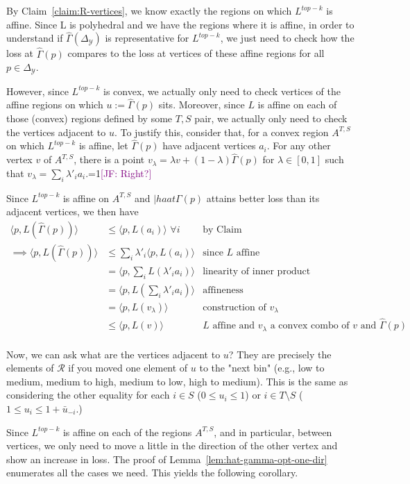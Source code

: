 \documentclass[12pt]{article}
\newcommand{\Comments}{1}
\newcommand{\mynote}[2]{\ifnum\Comments=1\textcolor{#1}{#2}\fi}
\newcommand{\jessie}[1]{\mynote{purple}{[JF: #1]}}
\newcommand{\simplex}{\Delta_\Y}
\newcommand{\R}{\mathcal{R}}
\newcommand{\Y}{\mathcal{Y}}
\newcommand{\inprod}[2]{\langle #1, #2 \rangle}%
\begin{document}
By Claim~\ref{claim:R-vertices}, we know exactly the regions on which $L^{top-k}$ is affine.
Since L is polyhedral and we have the regions where it is affine, in order to understand if $\hat \Gamma(\simplex)$ is representative for $L^{top-k}$, we just need to check how the loss at $\hat \Gamma(p)$ compares to the loss at vertices of these affine regions for all $p \in \simplex$.  

However, since $L^{top-k}$ is convex, we actually only need to check vertices of the affine regions on which $u := \hat \Gamma(p)$ sits.  
Moreover, since $L$ is affine on each of those (convex) regions defined by some $T,S$ pair, we actually only need to check the vertices adjacent to $u$.
To justify this, consider that, for a convex region $A^{T,S}$ on which $L^{top-k}$ is affine, let $\hat \Gamma(p)$ have adjacent vertices $a_i$.
For any other vertex $v$ of $A^{T,S}$, there is a point $v_\lambda = \lambda v + (1-\lambda) \hat \Gamma(p)$ for $\lambda \in [0,1]$ such that $v_\lambda = \sum_i \lambda'_i a_i$.\jessie{Right?}

Since $L^{top-k}$ is affine on $A^{T,S}$ and $|haat \Gamma(p)$ attains better loss than its adjacent vertices, we then have 
\begin{align*}
\inprod{p}{L(\hat \Gamma(p))} &\leq \inprod{p}{L(a_i)} \,\, \forall i & \text{by Claim} \\
\implies \inprod{p}{L(\hat \Gamma(p))} &\leq \sum_i \lambda'_i \inprod{p}{L(a_i)} & \text{since $L$ affine} \\
&= \inprod{p}{\sum_i L(\lambda'_i a_i)} & \text{linearity of inner product}\\
&= \inprod{p}{L(\sum_i \lambda'_i a_i)} & \text{affineness}\\
&= \inprod{p}{L(v_\lambda)} & \text{construction of $v_\lambda$}\\
&\leq \inprod{p}{L(v)} & \text{$L$ affine and $v_\lambda$ a convex combo of $v$ and $\hat \Gamma(p)$}\\
\end{align*}

Now, we can ask what are the vertices adjacent to $u$?  They are precisely the elements of $\R$ if you moved one element of $u$ to the "next bin" (e.g., low to medium, medium to high, medium to low, high to medium).  
This is the same as considering the other equality for each $i \in S$ ($0 \leq u_i \leq 1$) or $i \in T \setminus S$ ($1 \leq u_i \leq 1 + \bar u_{-i}$.) 

Since $L^{top-k}$ is affine on each of the regions $A^{T,S}$,  and in particular, between vertices, we only need to move a little in the direction of the other vertex and show an increase in loss. 
The proof of Lemma~\ref{lem:hat-gamma-opt-one-dir} enumerates all the cases we need.
This yields the following corollary.
\end{document}
